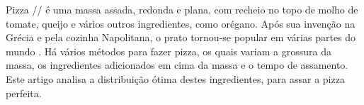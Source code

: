 \begin{resumo} 
  Pizza // é uma massa assada, redonda e plana, com recheio
  no topo de molho de tomate, queijo e vários outros ingredientes,
  como orégano.  Após
  sua invenção na Grécia e pela cozinha Napolitana, o prato tornou-se popular
  em várias partes do mundo \cite{civitello2007cuisine}.  Há vários métodos para fazer 
  pizza, os quais variam a grossura da massa, os ingredientes adicionados em 
  cima da massa e o tempo de assamento.  Este artigo 
  analisa a distribuição
  ótima destes ingredientes, para assar a pizza perfeita.
 \end{resumo}

